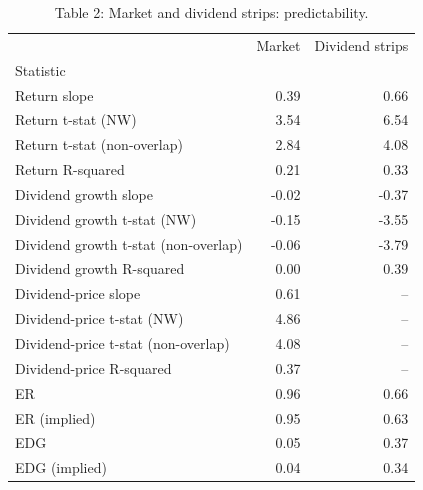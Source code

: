 \begin{table}
\caption{Table 2: Market and dividend strips: predictability.}
\label{tab:replication_2}
\begin{tabular}{lrr}
\toprule
 & Market & Dividend strips \\
Statistic &  &  \\
\midrule
Return slope & 0.39 & 0.66 \\
Return t-stat (NW) & 3.54 & 6.54 \\
Return t-stat (non-overlap) & 2.84 & 4.08 \\
Return R-squared & 0.21 & 0.33 \\
Dividend growth slope & -0.02 & -0.37 \\
Dividend growth t-stat (NW) & -0.15 & -3.55 \\
Dividend growth t-stat (non-overlap) & -0.06 & -3.79 \\
Dividend growth R-squared & 0.00 & 0.39 \\
Dividend-price slope & 0.61 & -- \\
Dividend-price t-stat (NW) & 4.86 & -- \\
Dividend-price t-stat (non-overlap) & 4.08 & -- \\
Dividend-price R-squared & 0.37 & -- \\
ER & 0.96 & 0.66 \\
ER (implied) & 0.95 & 0.63 \\
EDG & 0.05 & 0.37 \\
EDG (implied) & 0.04 & 0.34 \\
\bottomrule
\end{tabular}
\end{table}
